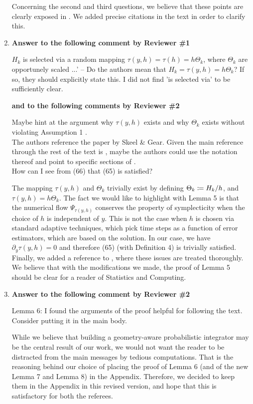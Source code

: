 \documentclass[10pt]{article}
\begin{document}
\begin{enumerate}
	Concerning the second and third questions, we believe that these points are clearly exposed in \cite[Chapter IX]{HLW06}. We added precise citations in the text in order to clarify this. 
	\item \textbf{Answer to the following comment by Reviewer \#1}
	\begin{itquote}
		$H_k$ is selected via a random mapping $\tau(y,h)=\tau(h)=h\Theta_k$, where $\Theta_k$ are opportunely scaled ...' -- Do the authors mean that $H_k=\tau(y,h)=h\Theta_k$? If so, they should explicitly state this. I did not find 'is selected via' to be sufficiently clear.
	\end{itquote}
	\textbf{and to the following comments by Reviewer \#2}
	\begin{itquote}
		Maybe hint at the argument why $\tau(y, h)$ exists and why $\Theta_k$ exists without violating Assumption 1 .\\
		The authors reference the paper by Skeel \& Gear. Given the main reference through the rest of the text is \cite{HLW06}, maybe the authors could use the notation thereof and point to specific sections of \cite{HLW06}.\\
		How can I see from (66) that (65) {} is satisfied?
	\end{itquote}
	The mapping $\tau(y, h)$ and $\Theta_k$ trivially exist by defining $\Theta_k \coloneqq H_k / h$, and $\tau(y, h) = h \Theta_k$. The fact we would like to highlight with Lemma 5 is that the numerical flow $\Psi_{\tau(y, h)}$ conserves the property of symplecticity when the choice of $h$ is independent of $y$. This is not the case when $h$ is chosen via standard adaptive techniques, which pick time steps as a function of error estimators, which are based on the solution. In our case, we have $\partial_y \tau(y, h) = 0$ and therefore (65) (with Definition 4) is trivially satisfied. Finally, we added a reference to \cite[Section VIII.1]{HLW06}, where these issues are treated thoroughly. We believe that with the modifications we made, the proof of Lemma 5 should be clear for a reader of Statistics and Computing.
	\item \textbf{Answer to the following comment by Reviewer \#2}
	\begin{itquote}
		Lemma 6: I found the arguments of the proof helpful for following the text. Consider putting it in the main body.
	\end{itquote}
	While we believe that building a geometry-aware probabilistic integrator may be the central result of our work, we would not want the reader to be distracted from the main messages by tedious computations. That is the reasoning behind our choice of placing the proof of Lemma 6 (and of the new Lemma 7 and Lemma 8) in the Appendix. Therefore, we decided to keep them in the Appendix in this revised version, and hope that this is satisfactory for both the referees. 

\end{enumerate}
\end{document}
